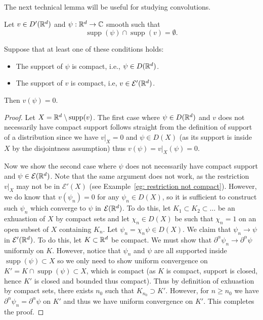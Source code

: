 \documentclass[twoside, a4paper, 10pt]{amsart}
\begin{document}
The next technical lemma will be useful for studying convolutions.

\begin{lemma}\label{lemma: disjoint supports} Let $v \in D'(\mathbb{R}^d)$ and $\psi:\mathbb{R}^d \to \mathbb{C}$ smooth such that $$\operatorname{supp}(\psi) \cap \operatorname{supp}(v) = \emptyset.$$ 

Suppose that at least one of these conditions holds:

\begin{itemize}
	\item The support of $\psi$ is compact, i.e., $\psi \in D(\mathbb{R}^d)$.
	\item The support of $v$ is compact, i.e, $v \in \mathcal{E}'(\mathbb{R}^d)$.
\end{itemize}

Then $v(\psi) = 0$.

\end{lemma}

\begin{proof}

Let $X = \mathbb{R}^d \setminus \operatorname{supp}(v)$. The first case where $\psi \in D(\mathbb{R}^d)$ and $v$ does not necessarily have compact support follows straight from the definition of support of a distribution since we have $v|_{X}=0$ and $\psi \in D(X)$ (as its support is inside $X$ by the disjointness assumption) thus $v(\psi) = v|_{X}(\psi) = 0$.

Now we show the second case where $\psi$ does not necessarily have compact support and $\psi \in \mathcal{E}(\mathbb{R}^d)$. Note that the same argument does not work, as the restriction $v|_X$ may not be in $\mathcal{E}'(X)$ (see Example~\ref{eg: restriction not compact}).  However, we do know that $v(\psi_n) = 0$ for any $\psi_n \in D(X)$, so it is sufficient to construct such $\psi_n$ which converge to $\psi$ in $\mathcal{E}(\mathbb{R}^d)$. To do this, let $K_1 \subset K_2 \subset \ldots$ be an exhuastion of $X$ by compact sets and let $\chi_n \in D(X)$ be such that $\chi_n = 1$ on an open subset of $X$ containing $K_n$. Let $\psi_n = \chi_n \psi \in D(X)$. We claim that $\psi_n \to \psi$ in $\mathcal{E}'(\mathbb{R}^d)$. To do this, let $K \subset \mathbb{R}^d$ be compact. We must show that $\partial^{\alpha} \psi_n \to \partial^{\alpha} \psi$ uniformly on $K$. However, notice that $\psi_n$ and $\psi$ are all supported inside $\operatorname{supp} (\psi) \subset X$ so we only need to show uniform convergence on $K' = K \cap \operatorname{supp}(\psi) \subset X$, which is compact (as $K$ is compact, support is closed, hence $K'$ is closed and bounded thus compact). Thus by definition of exhuastion by compact sets, there exists $n_0$ such that $K_{n_0} \supset K'$. However, for $n \geq n_0$ we have $\partial^{\alpha} \psi_n = \partial^{\alpha} \psi$ on $K'$ and thus we have uniform convergence on $K'$. This completes the proof. \end{proof}
\end{document}
